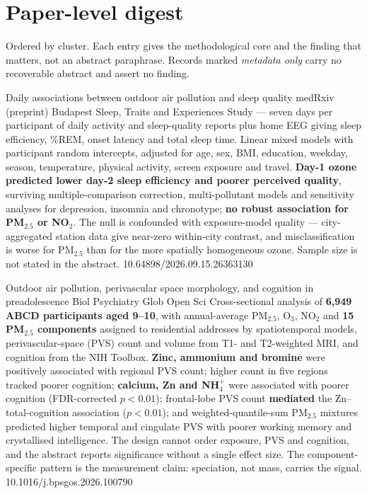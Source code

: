 \documentclass[10pt]{article}
\begin{document}
\section*{\sffamily\bfseries\color{Deep}Paper-level digest}
\vspace{-1.5mm}{\color{Amber}\rule{\linewidth}{1.1pt}}\vspace{1mm}

{\fontsize{7.4}{9}\selectfont\color{Slate}Ordered by cluster. Each entry gives the
methodological core and the finding that matters, not an abstract paraphrase. Records
marked \textit{metadata only} carry no recoverable abstract and assert no finding.\par}


{Daily associations between outdoor air pollution and sleep quality}
{medRxiv (preprint)}
{Budapest Sleep, Traits and Experiences Study --- seven days per participant of daily
activity and sleep-quality reports plus home EEG giving sleep efficiency, \%REM, onset
latency and total sleep time. Linear mixed models with participant random intercepts,
adjusted for age, sex, BMI, education, weekday, season, temperature, physical activity,
screen exposure and travel. \textbf{Day-1 ozone predicted lower day-2 sleep efficiency
and poorer perceived quality}, surviving multiple-comparison correction, multi-pollutant
models and sensitivity analyses for depression, insomnia and chronotype;
\textbf{no robust association for PM$_{2.5}$ or NO$_2$}. The null is confounded with
exposure-model quality --- city-aggregated station data give near-zero within-city
contrast, and misclassification is worse for PM$_{2.5}$ than for the more spatially
homogeneous ozone. Sample size is not stated in the abstract.}
{10.64898/2026.09.15.26363130}

{Outdoor air pollution, perivascular space morphology, and cognition in preadolescence}
{Biol Psychiatry Glob Open Sci}
{Cross-sectional analysis of \textbf{6,949 ABCD participants aged 9--10}, with annual-average
PM$_{2.5}$, O$_3$, NO$_2$ and \textbf{15 PM$_{2.5}$ components} assigned to residential
addresses by spatiotemporal models, perivascular-space (PVS) count and volume from T1- and
T2-weighted MRI, and cognition from the NIH Toolbox. \textbf{Zinc, ammonium and bromine}
were positively associated with regional PVS count; higher count in five regions tracked
poorer cognition; \textbf{calcium, Zn and NH$_4^+$} were associated with poorer cognition
(FDR-corrected $p<0.01$); frontal-lobe PVS count \textbf{mediated} the Zn--total-cognition
association ($p<0.01$); and weighted-quantile-sum PM$_{2.5}$ mixtures predicted higher
temporal and cingulate PVS with poorer working memory and crystallised intelligence. The
design cannot order exposure, PVS and cognition, and the abstract reports significance
without a single effect size. The component-specific pattern is the measurement claim:
speciation, not mass, carries the signal.}
{10.1016/j.bpsgos.2026.100790}
\end{document}
